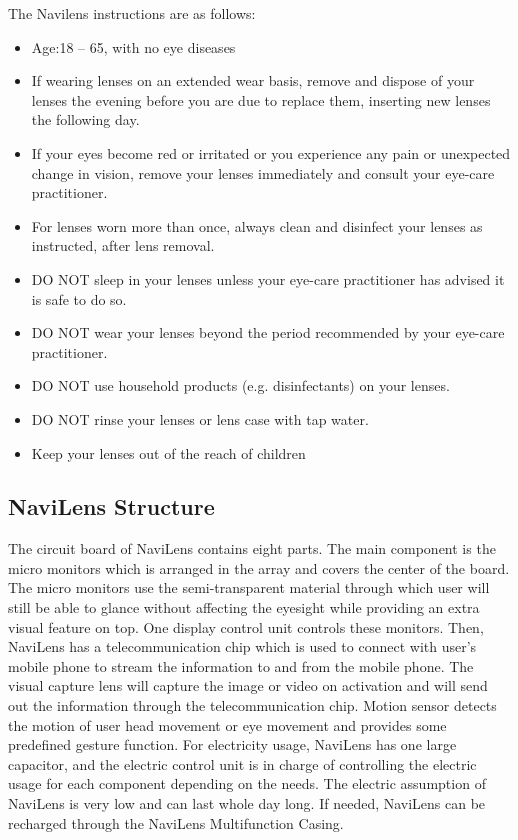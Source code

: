 \documentclass{chi-ext}
\begin{document}
\begin{multicols}{2}
The Navilens instructions are as follows:
\begin{itemize}
  \item Age:18 -- 65, with no eye diseases
  \item If wearing lenses on an extended wear basis, remove and dispose of your lenses the evening before you are due to replace them, inserting new lenses the following day.
  \item	If your eyes become red or irritated or you experience any pain or unexpected change in vision, remove your lenses immediately and consult your eye-care practitioner.
  \item	For lenses worn more than once, always clean and disinfect your lenses as instructed, after lens removal.
  \item	DO NOT sleep in your lenses unless your eye-care practitioner has advised it is safe to do so.
  \item	DO NOT wear your lenses beyond the period recommended by your eye-care practitioner. 
  \item	DO NOT use household products (e.g. disinfectants) on your lenses. 
  \item	DO NOT rinse your lenses or lens case with tap water.
  \item	Keep your lenses out of the reach of children
\end{itemize}

\subsection{NaviLens Structure}

The circuit board of NaviLens contains eight parts. The main component is the micro monitors which is arranged in the array and covers the center of the board. The micro monitors use the semi-transparent material through which user will still be able to glance without affecting the eyesight while providing an extra visual feature on top. One display control unit controls these monitors. Then, NaviLens has a telecommunication chip which is used to connect with user’s mobile phone to stream the information to and from the mobile phone. The visual capture lens will capture the image or video on activation and will send out the information through the telecommunication chip. Motion sensor detects the motion of user head movement or eye movement and provides some predefined gesture function. For electricity usage, NaviLens has one large capacitor, and the electric control unit is in charge of controlling the electric usage for each component depending on the needs. The electric assumption of NaviLens is very low and can last whole day long. If needed, NaviLens can be recharged through the NaviLens Multifunction Casing.\\



\end{multicols}
\end{document}
